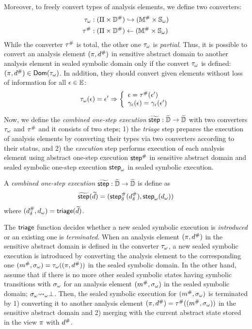 Moreover, to freely convert types of analysis elements, we define two converters:
\begin{align}
  {\tau}_\omega & : (\Pi \times {\mathbb{D}}^{\#}) \hookrightarrow
    ({\mathbb{M}}^{\#} \times {\mathbb{S}}_\omega)\\
  {\tau}^{\#} & : (\Pi \times
    {\mathbb{D}}^{\#}) \leftarrow ({\mathbb{M}}^{\#} \times {\mathbb{S}}_\omega)
\end{align}
While the converter ${\tau}^{\#}$ is total, the other one ${\tau}_\omega$ is
\textit{partial}. Thus, it is possible to convert an analysis element
$(\pi, {d}^{\#})$ in sensitive abstract domain to another analysis element in
sealed symbolic domain only if the convert ${\tau}_\omega$ is defined: $(\pi,
{d}^{\#}) \in \textsf{Dom}({\tau}_\omega)$.  In addition, they should convert given
elements without loss of information for all $\epsilon \in \mathbb{E}$:
\[
  {\tau}_\omega(\epsilon) = \epsilon' \Rightarrow \left\{
  \begin{array}{l}
    \epsilon = {\tau}^{\#}(\epsilon')\\
    \gamma_{\epsilon}(\epsilon) = \gamma_{\epsilon}(\epsilon')\\
  \end{array}
  \right.
\]

Now, we define the \textit{combined one-step execution} $\widetilde{\textsf{step}}: \widetilde{\mathbb{D}}
\rightarrow \widetilde{\mathbb{D}}$ with two converters ${\tau}_\omega$ and ${\tau}^{\#}$ and
it consists of two steps; 1) the \textit{triage} step prepares the execution of
analysis elements by converting their types via two converters according to
their status, and 2) the \textit{execution} step performs execution of each
analysis element using abstract one-step execution ${\textsf{step}}^{\#}$ in sensitive
abstract domain and sealed symbolic one-step execution ${\textsf{step}}_\omega$ in sealed
symbolic execution.
\begin{definition}
  A \textit{combined one-step execution} $\widetilde{\textsf{step}}: \widetilde{\mathbb{D}} \rightarrow
  \widetilde{\mathbb{D}}$ is define as
  \[
    \widetilde{\textsf{step}}(\widetilde{d}) = ({\textsf{step}}^{\#}_\delta({{d}^{\#}_\delta}), {\textsf{step}}_\omega({d}_\omega))
  \]
  where $({{d}^{\#}_\delta}, {d}_\omega) = \textsf{triage}(\widetilde{d})$.
\end{definition}

The $\textsf{triage}$ function decides whether a new sealed symbolic execution is
\textit{introduced} or an existing one is \textit{terminated}.  When an analysis
element $(\pi, {d}^{\#})$ in the sensitive abstract domain is defined in the
converter ${\tau}_\omega$, a new sealed symbolic execution is introduced by
converting the analysis element to the corresponding one $({m}^{\#}, {\sigma}_\omega) =
{\tau}_\omega((\pi, {d}^{\#}))$ in the sealed symbolic domain.  In the other
hand, assume that if there is no more other sealed symbolic states having
symbolic transitions with ${\sigma}_\omega$ for an analysis element $({m}^{\#},
{\sigma}_\omega)$ in the sealed symbolic domain; ${\sigma}_\omega {\leadsto}_\omega \bot$.  Then, the
sealed symbolic execution for $({m}^{\#}, {\sigma}_\omega)$ is terminated by 1)
converting it to another analysis element $(\pi, {d}^{\#}) =
{\tau}^{\#}(({m}^{\#}, {\sigma}_\omega))$ in the sensitive abstract domain and 2)
merging with the current abstract state stored in the view $\pi$ with
${d}^{\#}$.

